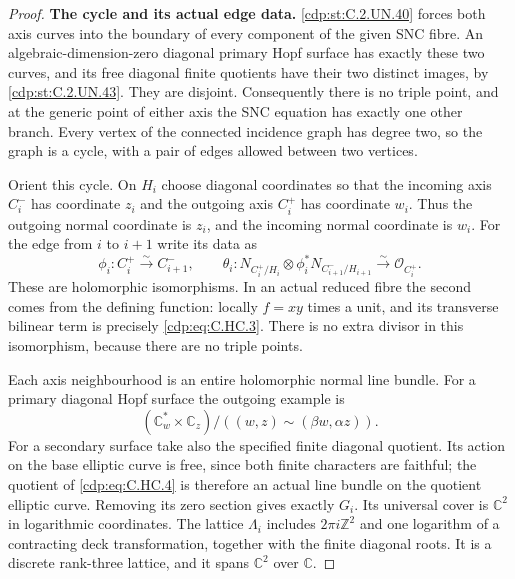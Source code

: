 \begin{proof}
\par\medskip\noindent\textbf{The cycle and its actual edge data.}
\ref{cdp:st:C.2.UN.40} forces both axis curves into the boundary of
every component of the given SNC fibre. An
algebraic-dimension-zero diagonal primary Hopf surface
has exactly these two curves, and its free diagonal
finite quotients have their two distinct images, by
\ref{cdp:st:C.2.UN.43}. They are disjoint. Consequently there is
no triple point, and at the generic point of either
axis the SNC equation has exactly one other branch.
Every vertex of the connected incidence graph has
degree two, so the graph is a cycle, with a pair
of edges allowed between two vertices.

Orient this cycle. On $H_i$ choose diagonal coordinates
so that the incoming axis $C_i^-$ has coordinate $z_i$
and the outgoing axis $C_i^+$ has coordinate $w_i$.
Thus the outgoing normal coordinate is $z_i$, and
the incoming normal coordinate is $w_i$.
For the edge from $i$ to $i+1$ write its data as
\[
 \phi_i:C_i^+\xrightarrow{\sim}C_{i+1}^-,
 \qquad
 \theta_i:N_{C_i^+/H_i}\otimes
       \phi_i^*N_{C_{i+1}^-/H_{i+1}}
           \xrightarrow{\sim}\mathcal O_{C_i^+}.
\tag{C.HC.3}\label{cdp:eq:C.HC.3}
\]
These are holomorphic isomorphisms. In an actual
reduced fibre the second comes from the defining
function: locally $f=xy$ times a unit, and its
transverse bilinear term is precisely \eqref{cdp:eq:C.HC.3}.
There is no extra divisor in this isomorphism,
because there are no triple points.

Each axis neighbourhood is an entire holomorphic
normal line bundle. For a primary diagonal Hopf
surface the outgoing example is
\[
 (\mathbb C^*_{w}\times\mathbb C_z)/
       ((w,z)\sim(\beta w,\alpha z)).
\tag{C.HC.4}\label{cdp:eq:C.HC.4}
\]
For a secondary surface take also the specified
finite diagonal quotient. Its action on the base
elliptic curve is free, since both finite characters
are faithful; the quotient of \eqref{cdp:eq:C.HC.4} is therefore
an actual line bundle on the quotient elliptic curve.
Removing its zero section gives exactly $G_i$.
Its universal cover is $\mathbb C^2$ in logarithmic
coordinates. The lattice $\Lambda_i$ includes
$2\pi i\mathbb Z^2$ and one logarithm of a contracting
deck transformation, together with the finite
diagonal roots. It is a discrete rank-three lattice,
and it spans $\mathbb C^2$ over $\mathbb C$.


\end{proof}
